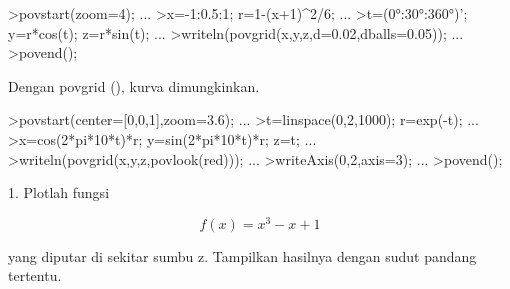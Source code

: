 \documentclass{article}
\begin{document}
\begin{eulernotebook}
\begin{eulercomment}
\begin{eulercomment}
\begin{eulercomment}
\begin{eulercomment}
\begin{eulercomment}
\begin{eulercomment}
\begin{eulercomment}
\begin{eulercomment}
\begin{eulercomment}
\begin{eulercomment}
\begin{eulercomment}
\begin{eulercomment}
\begin{eulercomment}
\begin{eulercomment}
\begin{eulercomment}
\begin{eulercomment}
\begin{eulercomment}
\begin{eulercomment}
\begin{eulercomment}
\begin{eulercomment}
\begin{eulercomment}
\begin{eulercomment}
\begin{eulerprompt}
>povstart(zoom=4); ...
>x=-1:0.5:1; r=1-(x+1)^2/6; ...
>t=(0°:30°:360°)'; y=r*cos(t); z=r*sin(t); ...
>writeln(povgrid(x,y,z,d=0.02,dballs=0.05)); ...
>povend();
\end{eulerprompt}
\begin{eulercomment}
Dengan povgrid (), kurva dimungkinkan.
\end{eulercomment}
\begin{eulerprompt}
>povstart(center=[0,0,1],zoom=3.6); ...
>t=linspace(0,2,1000); r=exp(-t); ...
>x=cos(2*pi*10*t)*r; y=sin(2*pi*10*t)*r; z=t; ...
>writeln(povgrid(x,y,z,povlook(red))); ...
>writeAxis(0,2,axis=3); ...
>povend();
\end{eulerprompt}
\eulersubheading{}
\begin{eulercomment}
\end{eulercomment}
\begin{eulercomment}
1. Plotlah fungsi\\
\end{eulercomment}
\begin{eulerformula}
\[
f(x)=x^3-x+1
\]
\end{eulerformula}
\begin{eulercomment}
yang diputar di sekitar sumbu z. Tampilkan hasilnya dengan sudut
pandang tertentu.


\end{eulercomment}
\end{eulercomment}
\end{eulercomment}
\end{eulercomment}
\end{eulercomment}
\end{eulercomment}
\end{eulercomment}
\end{eulercomment}
\end{eulercomment}
\end{eulercomment}
\end{eulercomment}
\end{eulercomment}
\end{eulercomment}
\end{eulercomment}
\end{eulercomment}
\end{eulercomment}
\end{eulercomment}
\end{eulercomment}
\end{eulercomment}
\end{eulercomment}
\end{eulercomment}
\end{eulercomment}
\end{eulercomment}
\end{eulernotebook}
\end{document}
